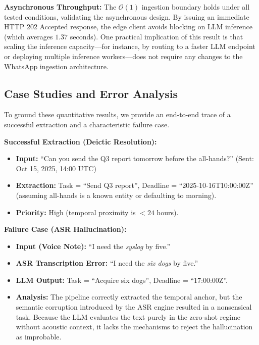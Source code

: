 \textbf{Asynchronous Throughput:} The $\mathcal{O}(1)$ ingestion boundary holds under all tested conditions, validating the asynchronous design. By issuing an immediate HTTP 202 Accepted response, the edge client avoids blocking on LLM inference (which averages $1.37$ seconds). One practical implication of this result is that scaling the inference capacity—for instance, by routing to a faster LLM endpoint or deploying multiple inference workers—does not require any changes to the WhatsApp ingestion architecture.

\subsection{Case Studies and Error Analysis}

To ground these quantitative results, we provide an end-to-end trace of a successful extraction and a characteristic failure case.

\textbf{Successful Extraction (Deictic Resolution):}
\begin{itemize}
    \item \textbf{Input:} ``Can you send the Q3 report tomorrow before the all-hands?'' (Sent: Oct 15, 2025, 14:00 UTC)
    \item \textbf{Extraction:} Task = ``Send Q3 report'', Deadline = ``2025-10-16T10:00:00Z'' (assuming all-hands is a known entity or defaulting to morning).
    \item \textbf{Priority:} High (temporal proximity is $< 24$ hours).
\end{itemize}

\textbf{Failure Case (ASR Hallucination):}
\begin{itemize}
    \item \textbf{Input (Voice Note):} ``I need the \textit{syslog} by five.''
    \item \textbf{ASR Transcription Error:} ``I need the \textit{six dogs} by five.''
    \item \textbf{LLM Output:} Task = ``Acquire six dogs'', Deadline = ``17:00:00Z''.
    \item \textbf{Analysis:} The pipeline correctly extracted the temporal anchor, but the semantic corruption introduced by the ASR engine resulted in a nonsensical task. Because the LLM evaluates the text purely in the zero-shot regime without acoustic context, it lacks the mechanisms to reject the hallucination as improbable.
\end{itemize}
